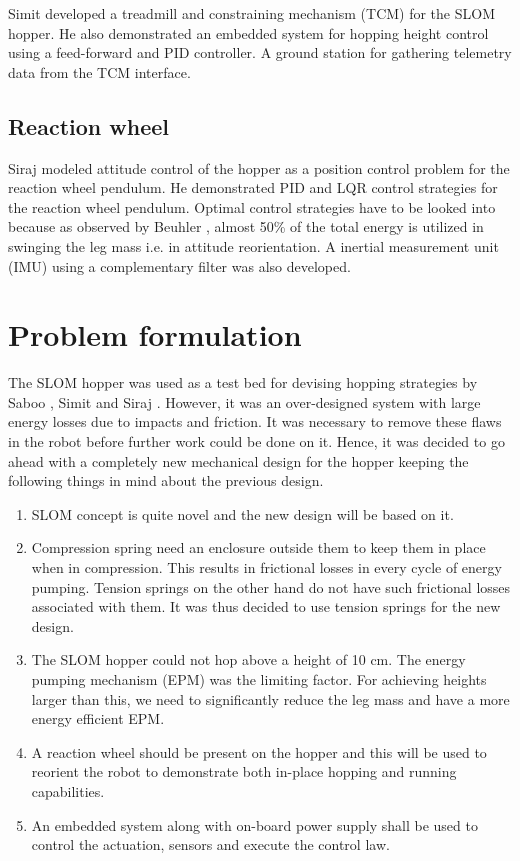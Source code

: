 Simit \cite{simit} developed a treadmill and constraining mechanism (TCM) for the SLOM hopper. He also demonstrated an embedded system
for hopping height control using a feed-forward and PID controller. A ground station for gathering telemetry data from the TCM 
interface.

\subsection{Reaction wheel}
Siraj \cite{siraj} modeled attitude control of the hopper as a position control problem for the reaction wheel pendulum. He
demonstrated PID and LQR control strategies for the reaction wheel pendulum. Optimal control strategies have to be looked into because
as observed by Beuhler \cite{Bue_PassRun, ARLMono2}, almost 50\% of the total energy is utilized in swinging the leg mass i.e. in
attitude reorientation. A inertial measurement unit (IMU) using a complementary filter was also developed.

\section{Problem formulation}
The SLOM hopper was used as a test bed for devising hopping strategies by Saboo \cite{saboo}, Simit \cite{simit} and Siraj \cite{siraj}. However, it was an over-designed system with large energy losses due to impacts and friction. It was necessary to
remove these flaws in the robot before further work could be done on it. Hence, it was decided to go ahead with a completely new
mechanical design for the hopper keeping the following things in mind about the previous design.
\begin{enumerate}
\item
SLOM concept is quite novel and the new design will be based on it.
\item
Compression spring need an enclosure outside them to keep them in place when in compression. This results in frictional losses in
every cycle of energy pumping. Tension springs on the other hand do not have such frictional losses associated with them. It was thus
decided to use tension springs for the new design.
\item
The SLOM hopper could not hop above a height of 10 cm. The energy pumping mechanism (EPM) was the limiting factor. For achieving heights larger than this, we need to significantly reduce the leg mass and have a more energy efficient EPM.
\item
A reaction wheel should be present on the hopper and this will be used to reorient the robot to demonstrate both in-place hopping
and running capabilities.
\item
An embedded system along with on-board power supply shall be used to control the actuation, sensors and execute the control law.
\end{enumerate}



